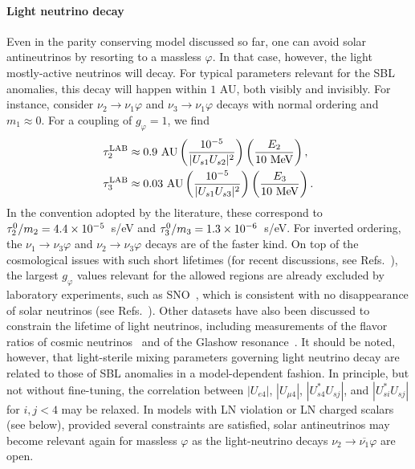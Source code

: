 \documentclass[
reprint,
superscriptaddress,
showpacs,
preprintnumbers,
nofootinbib,
nobibnotes,
amsmath,
amssymb, 
aps,
prd,
floatfix
]{revtex4-1}
\renewcommand{\phi}{\varphi}
\begin{document}
\paragraph{Light neutrino decay} Even in the parity conserving model discussed so far, one can avoid solar antineutrinos by resorting to a massless $\phi$. In that case, however, the light mostly-active neutrinos will decay. For typical parameters relevant for the SBL anomalies, this decay will happen within $1$ AU, both visibly and invisibly. For instance, consider $\nu_2 \to \nu_1 \phi$ and $\nu_3 \to \nu_1 \phi$ decays with normal ordering and $m_1\approx0$. For a coupling of $g_\phi=1$, we find
%
\begin{align}
    \tau_2^{\rm LAB}&\approx 0.9 \text{ AU} \left(\frac{10^{-5}}{|U_{s1}U_{s2}|^2}\right) \left(\frac{E_2}{10\text{ MeV}}\right),
    \\
    \tau_3^{\rm LAB} &\approx 0.03 \text{ AU} \left(\frac{10^{-5}}{|U_{s1}U_{s3}|^2}\right) \left(\frac{E_3}{10\text{ MeV}}\right).
\end{align}
%
In the convention adopted by the literature, these correspond to $\tau_2^{\rm 0}/m_2 = 4.4\times10^{-5}$~s/eV and $\tau_3^{\rm 0}/m_3 = 1.3\times10^{-6}$~s/eV. For inverted ordering, the $\nu_1\to\nu_3\phi$ and $\nu_2\to\nu_3\phi$ decays are of the faster kind. On top of the cosmological issues with such short lifetimes (for recent discussions, see Refs.~\cite{Escudero:2019gfk,Escudero:2020ped}), the largest $g_\phi$ values relevant for the allowed regions are already excluded by laboratory experiments, such as SNO~\cite{Aharmim:2011vm}, which is consistent with no disappearance of solar neutrinos (see Refs.~\cite{Beacom:2002cb,Berryman:2014qha}). Other datasets have also been discussed to constrain the lifetime of light neutrinos, including measurements of the flavor ratios of cosmic neutrinos~\cite{Bustamante:2016ciw} and of the Glashow resonance~\cite{Bustamante:2020niz}. It should be noted, however, that light-sterile mixing parameters governing light neutrino decay are related to those of SBL anomalies in a model-dependent fashion. In principle, but not without fine-tuning, the correlation between $|U_{e4}|$, $|U_{\mu4}|$, $|U_{s4}^*U_{sj}|$, and $|U_{si}^*U_{sj}|$ for $i,j<4$ may be relaxed. 
In models with LN violation or LN charged scalars (see below), provided several constraints are satisfied, solar antineutrinos may become relevant again for massless $\phi$ as the light-neutrino decays $\nu_2\to \overline{\nu_1} \phi$ are open.

\end{document}
